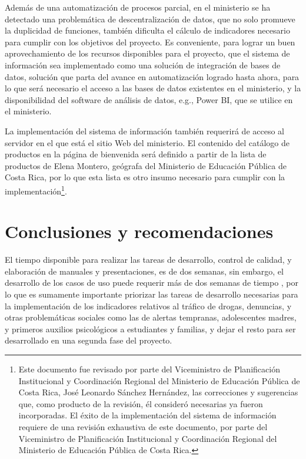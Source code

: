 \documentclass{article}
\begin{document}
\begin{multicols}{6}[]
Adem\'as de una automatizaci\'on de procesos parcial, en el ministerio se ha detectado una problem\'atica de descentralizaci\'on de datos, que no solo promueve la duplicidad de funciones, tambi\'en dificulta el c\'alculo de indicadores necesario para cumplir con los objetivos del proyecto. Es conveniente, para lograr un buen aprovechamiento de los recursos disponibles para el proyecto, que el sistema de informaci\'on sea implementado como una soluci\'on de integraci\'on de bases de datos, soluci\'on que parta del avance en automatizaci\'on logrado hasta ahora, para lo que ser\'a necesario el acceso a las bases de datos existentes en el ministerio, y la disponibilidad del software de an\'alisis de datos, e.g., Power BI, que se utilice en el ministerio.

La implementaci\'on del sistema de informaci\'on tambi\'en requerir\'a de acceso al servidor en el que est\'a el sitio Web del ministerio. El contenido del cat\'alogo de productos en la p\'agina de bienvenida ser\'a definido a partir de la lista de productos de Elena Montero, ge\'ografa del Ministerio de Educaci\'on P\'ublica de Costa Rica, por lo que esta lista es otro insumo necesario para cumplir con la implementaci\'on\footnote{Este documento fue revisado por parte del Viceministro de Planificaci\'on Institucional y Coordinaci\'on Regional del Ministerio de Educaci\'on P\'ublica de Costa Rica, Jos\'e Leonardo S\'anchez Hern\'andez, las correcciones y sugerencias que, como producto de la revisi\'on, \'el consider\'o necesarias ya fueron incorporadas. El \'exito de la implementaci\'on del sistema de informaci\'on requiere de una revisi\'on exhaustiva de este documento, por parte del Viceministro de Planificaci\'on Institucional y Coordinaci\'on Regional del Ministerio de Educaci\'on P\'ublica de Costa Rica.}. %

\section{Conclusiones y recomendaciones}

El tiempo disponible para realizar las tareas de desarrollo, control de calidad, y elaboraci\'on de manuales y presentaciones, es de dos semanas, sin embargo, el desarrollo de los casos de uso puede requerir m\'as de dos semanas de tiempo \cite{prop}, por lo que es sumamente importante priorizar las tareas de desarrollo necesarias para la implementaci\'on de los indicadores relativos al tr\'afico de drogas, denuncias, y otras problem\'aticas sociales como las de alertas tempranas, adolescentes madres, y primeros auxilios psicol\'ogicos a estudiantes y familias, y dejar el resto para ser desarrollado en una segunda fase del proyecto.


\end{multicols}
\end{document}

